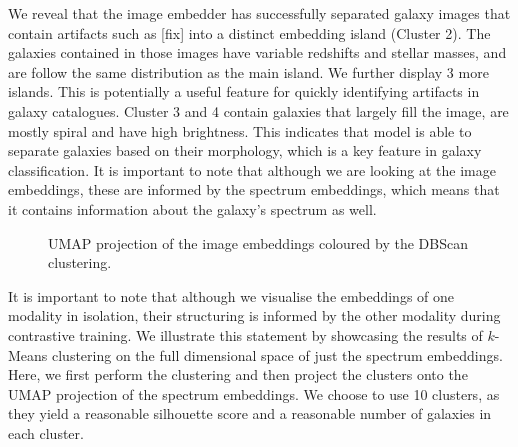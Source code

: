 \documentclass[a4paper,12pt]{article}
\begin{document}
We reveal that the image embedder has successfully separated galaxy images that contain artifacts such as [fix] into a distinct embedding island (Cluster 2). The galaxies contained in those images have variable redshifts and stellar masses, and are follow the same distribution as the main island. We further display 3 more islands. This is potentially a useful feature for quickly identifying artifacts in galaxy catalogues. Cluster 3 and 4 contain galaxies that largely fill the image, are mostly spiral and have high brightness. This indicates that model is able to separate galaxies based on their morphology, which is a key feature in galaxy classification. It is important to note that although we are looking at the image embeddings, these are informed by the spectrum embeddings, which means that it contains information about the galaxy's spectrum as well.


\begin{figure}[H]
    \centering
    \caption{UMAP projection of the image embeddings coloured by the DBScan clustering.}
    \label{fig:umap_DBSCAN}
\end{figure}


It is important to note that although we visualise the embeddings of one modality in isolation, their structuring is informed by the other modality during contrastive training. We illustrate this statement by showcasing the results of $k$-Means clustering on the full dimensional space of just the spectrum embeddings. Here, we first perform the clustering and then project the clusters onto the UMAP projection of the spectrum embeddings. We choose to use 10 clusters, as they yield a reasonable silhouette score and a reasonable number of galaxies in each cluster. 
\end{document}
